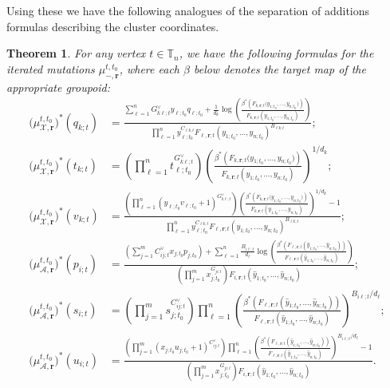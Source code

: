 \documentclass{amsart}
\newtheorem{theorem}{Theorem}[section]
\numberwithin{equation}{section}
\newcommand{\bfr}{{\boldsymbol{r}}}
\newcommand{\cA}{\mathcal{A}}
\newcommand{\cX}{\mathcal{X}}
\newcommand{\TT}{\mathbb{T}}
\begin{document}
Using these we have the following analogues of the separation of additions formulas describing the cluster coordinates.
\begin{theorem}
  \label{th:groupoid separation of additions}
  For any vertex $t\in\TT_n$, we have the following formulas for the iterated mutations $\mu_{-,\bfr}^{t,t_0}$, where each $\beta$ below denotes the target map of the appropriate groupoid:
  \begin{align}
    \label{eq:groupoid separation of additions 1}
    \big(\mu_{\cX,\bfr}^{t,t_0}\big)^*(q_{k;t})&=\frac{ \sum_{\ell=1}^n G^\vee_{k\ell;t} y_{\ell;t_0} q_{\ell;t_0} +\frac{1}{d_k} \log\left(\frac{\beta^*\left(F_{k,\bfr;t}\big(y_{1;t_0},\ldots,y_{n;t_0}\big)\right)}{F_{k,\bfr;t}(y_{1;t_0},\ldots,y_{n;t_0})}\right)}{\prod_{\ell=1}^n y_{\ell;t_0}^{C_{\ell k;t}} F_{\ell,\bfr;t}(y_{1;t_0},\ldots,y_{n;t_0})^{B_{\ell k;t}}};\\
    \big(\mu_{\cX,\bfr}^{t,t_0}\big)^*(t_{k;t})&=\left(\prod_{\ell=1}^n t_{\ell;t_0}^{G^\vee_{k\ell;t}}\right) \left(\frac{\beta^*\left(F_{k,\bfr;t}\big(y_{1;t_0},\ldots,y_{n;t_0}\big)\right)}{F_{k,\bfr;t}(y_{1;t_0},\ldots,y_{n;t_0})}\right)^{1/d_k};\\
    \big(\mu_{\cX,\bfr}^{t,t_0}\big)^*(v_{k;t})&=\frac{\left(\prod_{\ell=1}^n (y_{\ell;t_0} v_{\ell;t_0} + 1)^{G^\vee_{k\ell;t}}\right) \left(\frac{\beta^*\left(F_{k,\bfr;t}\big(y_{1;t_0},\ldots,y_{n;t_0}\big)\right)}{F_{k,\bfr;t}(y_{1;t_0},\ldots,y_{n;t_0})}\right)^{1/d_k} - 1}{\prod_{\ell=1}^n y_{\ell;t_0}^{C_{\ell k;t}} F_{\ell,\bfr;t}(y_{1;t_0},\ldots,y_{n;t_0})^{B_{\ell k;t}}};\\
    \big(\mu_{\cA,\bfr}^{t,t_0}\big)^*(p_{i;t})&=\frac{\left(\sum_{j=1}^m C^\vee_{ij;t} x_{j;t_0} p_{j;t_0}\right) + \sum_{\ell=1}^n \frac{B_{i\ell;t}}{d_\ell}\log\left(\frac{\beta^*\left(F_{\ell,\bfr;t}(\hat y_{1;t_0},\ldots,\hat y_{n;t_0})\right)}{F_{\ell,\bfr;t}(\hat y_{1;t_0},\ldots,\hat y_{n;t_0})}\right)}{\left(\prod_{j=1}^m x_{j;t_0}^{G_{ji;t}}\right) F_{i,\bfr;t}(\hat y_{1;t_0},\ldots,\hat y_{n;t_0})};\\
    \label{eq:groupoid separation of additions 2}
    \big(\mu_{\cA,\bfr}^{t,t_0}\big)^*(s_{i;t})&=\left(\prod_{j=1}^m s_{j;t_0}^{C^\vee_{ij;t}}\right) \prod_{\ell=1}^n \left(\frac{\beta^*\left(F_{\ell,\bfr;t}(\hat y_{1;t_0},\ldots,\hat y_{n;t_0})\right)}{F_{\ell,\bfr;t}(\hat y_{1;t_0},\ldots,\hat y_{n;t_0})}\right)^{B_{i\ell;t}/d_\ell};\\
    \big(\mu_{\cA,\bfr}^{t,t_0}\big)^*(u_{i;t})&=\frac{\left(\prod_{j=1}^m (x_{j;t_0} u_{j;t_0} + 1)^{C^\vee_{ij;t}}\right) \prod_{\ell=1}^n \left(\frac{\beta^*\left(F_{\ell,\bfr;t}(\hat y_{1;t_0},\ldots,\hat y_{n;t_0})\right)}{F_{\ell,\bfr;t}(\hat y_{1;t_0},\ldots,\hat y_{n;t_0})}\right)^{B_{i\ell;t}/d_\ell} - 1}{\left(\prod_{j=1}^m x_{j;t_0}^{G_{ji;t}}\right) F_{i,\bfr;t}(\hat y_{1;t_0},\ldots,\hat y_{n;t_0})}.
  \end{align}
\end{theorem}
\end{document}
